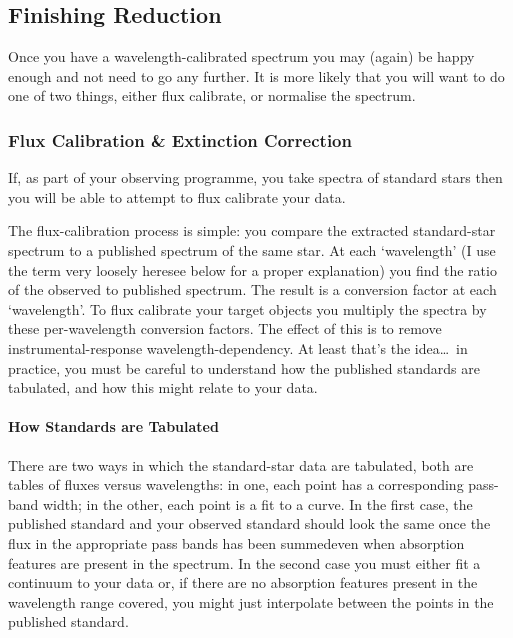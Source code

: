 \subsection{Finishing Reduction}

Once you have a wavelength-calibrated spectrum you may (again)
be happy enough and not need to go any further.
It is more likely that you will want to do one of two things,
either flux calibrate, or normalise the spectrum.


\subsubsection{Flux Calibration \&
               Extinction Correction}

If, as part of your observing programme, you take spectra of standard stars
then you will be able to attempt to flux calibrate your data.

The flux-calibration process is simple: you compare the extracted
standard-star spectrum to a published spectrum of the same star.  At each
`wavelength' (I use the term very loosely here\scspec{---}{ - }see below for a
proper explanation) you find the ratio of the observed to published spectrum.
The result is a conversion factor at each `wavelength'.
To flux calibrate your target objects you multiply the spectra by these
per-wavelength conversion factors.  The effect of this is to remove
instrumental-response wavelength-dependency.  At least that's the
idea\ldots\ in practice, you must be careful to understand how the
published standards are tabulated, and how this might relate to your data.

\paragraph{How Standards are Tabulated}

There are two ways in which the standard-star data are tabulated,
both are tables of fluxes versus wavelengths:
in one, each point has a corresponding pass-band width;
in the other, each point is a fit to a
 curve.
In the first case, the published standard and your observed standard should
look the same once the flux in the appropriate pass bands has been
summed\scspec{---}{ - }even when absorption features are present in the
spectrum.  In the second case you must either fit a continuum to your
data or, if there are no absorption features present in the wavelength range
covered, you might just interpolate between the points in the published
standard.

